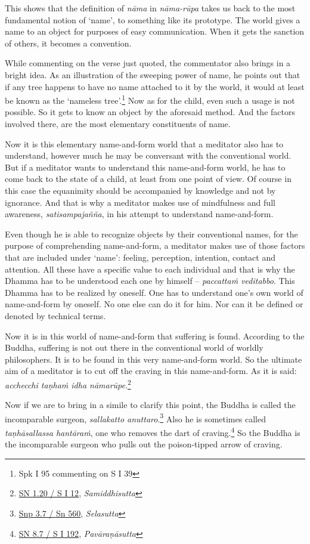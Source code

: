 This shows that the definition of \emph{nāma} in \emph{nāma-rūpa} takes us back to the most fundamental notion of `name', to something like its prototype. The world gives a name to an object for purposes of easy communication. When it gets the sanction of others, it becomes a convention.

While commenting on the verse just quoted, the commentator also brings in a bright idea. As an illustration of the sweeping power of name, he points out that if any tree happens to have no name attached to it by the world, it would at least be known as the `nameless tree'.\footnote{Spk I 95 commenting on S I 39} Now as for the child, even such a usage is not possible. So it gets to know an object by the aforesaid method. And the factors involved there, are the most elementary constituents of name.

Now it is this elementary name-and-form world that a meditator also has to understand, however much he may be conversant with the conventional world. But if a meditator wants to understand this name-and-form world, he has to come back to the state of a child, at least from one point of view. Of course in this case the equanimity should be accompanied by knowledge and not by ignorance. And that is why a meditator makes use of mindfulness and full awareness, \emph{satisampajañña}, in his attempt to understand name-and-form.

Even though he is able to recognize objects by their conventional names, for the purpose of comprehending name-and-form, a meditator makes use of those factors that are included under `name': feeling, perception, intention, contact and attention. All these have a specific value to each individual and that is why the Dhamma has to be understood each one by himself -- \emph{paccattaṁ veditabbo}. This Dhamma has to be realized by oneself. One has to understand one's own world of name-and-form by oneself. No one else can do it for him. Nor can it be defined or denoted by technical terms.

Now it is in this world of name-and-form that suffering is found. According to the Buddha, suffering is not out there in the conventional world of worldly philosophers. It is to be found in this very name-and-form world. So the ultimate aim of a meditator is to cut off the craving in this name-and-form. As it is said: \emph{acchecchi taṇhaṁ idha nāmarūpe}.\footnote{\href{https://suttacentral.net/sn1.20/pli/ms}{SN 1.20 / S I 12}, \emph{Samiddhisutta}}

Now if we are to bring in a simile to clarify this point, the Buddha is called the incomparable surgeon, \emph{sallakatto anuttaro}.\footnote{\href{https://suttacentral.net/snp3.7/pli/ms}{Snp 3.7 / Sn 560}, \emph{Selasutta}} Also he is sometimes called \emph{taṇhāsallassa hantāraṁ}, one who removes the dart of craving.\footnote{\href{https://suttacentral.net/sn8.7/pli/ms}{SN 8.7 / S I 192}, \emph{Pavāraṇāsutta}} So the Buddha is the incomparable surgeon who pulls out the poison-tipped arrow of craving.

